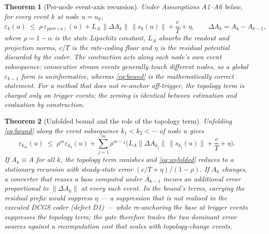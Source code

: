 \documentclass[preprint,12pt]{elsarticle}
\newtheorem{theorem}{Theorem}
\begin{document}
\begin{theorem}[Per-node event-axis recursion]
\label{thm:t2}
Under Assumptions A1--A6 below, for every event $k$ at node $u=u_k$,
\begin{equation}
\varepsilon_k(u) \;\le\; \rho\,\varepsilon_{\mathrm{prev}(u)}(u)
+ L_A\,\|\Delta A_k\|\,\|s_k(u)\|
+ \frac{c}{T}+\eta ,
\qquad \Delta A_k=A_k-A_{k-1},
\label{eq:bound}
\end{equation}
where $\rho=1-\alpha$ is the state Lipschitz constant, $L_A$ absorbs the readout and projection norms, $c/T$ is the rate-coding floor and $\eta$ is the residual potential discarded by the coder. The contraction acts along each node's \emph{own} event subsequence: consecutive stream events generally touch different nodes, so a global $\varepsilon_{k-1}$ form is uninformative, whereas \eqref{eq:bound} is the mathematically correct statement. For a method that does not re-anchor off-trigger, the topology term is charged only on trigger events; the zeroing is identical between estimation and evaluation by construction.
\end{theorem}

\begin{theorem}[Unfolded bound and the role of the topology term]
\label{thm:t3}
Unfolding \eqref{eq:bound} along the event subsequence $k_1<k_2<\cdots$ of node $u$ gives
\begin{equation}
\varepsilon_{k_m}(u) \;\le\; \rho^{m}\varepsilon_{k_0}(u)
+\sum_{j=1}^{m}\rho^{m-j}\Big(L_A\|\Delta A_{k_j}\|\,\|s_{k_j}(u)\|+\frac{c}{T}+\eta\Big).
\label{eq:unfolded}
\end{equation}
If $A_k\equiv A$ for all $k$, the topology term vanishes and \eqref{eq:unfolded} reduces to a stationary recursion with steady-state error $(c/T+\eta)/(1-\rho)$. If $A_k$ changes, a converter that reuses a base computed under $A_{k-1}$ incurs an additional error proportional to $\|\Delta A_k\|$ at every such event. In the bound's terms, carrying the residual prefix would suppress $\eta$ --- a suppression that is \emph{not realised} in the executed DCGS coder (defect D1) --- while re-anchoring the base at trigger events suppresses the topology term; the gate therefore trades the two dominant error sources against a recomputation cost that scales with topology-change events.
\end{theorem}
\end{document}
